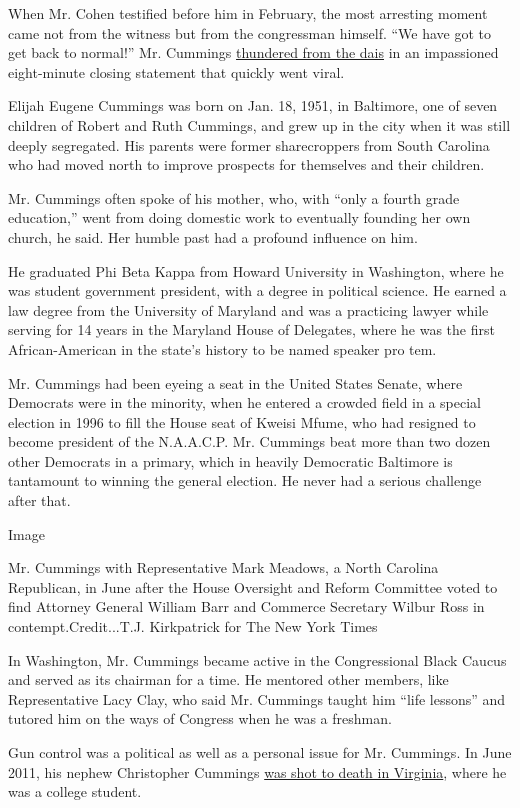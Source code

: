 When Mr. Cohen testified before him in February, the most arresting
moment came not from the witness but from the congressman himself. ``We
have got to get back to normal!'' Mr. Cummings
\href{https://www.youtube.com/watch?v=AAdmsSJXn68}{thundered from the
dais} in an impassioned eight-minute closing statement that quickly went
viral.

Elijah Eugene Cummings was born on Jan. 18, 1951, in Baltimore, one of
seven children of Robert and Ruth Cummings, and grew up in the city when
it was still deeply segregated. His parents were former sharecroppers
from South Carolina who had moved north to improve prospects for
themselves and their children.

Mr. Cummings often spoke of his mother, who, with ``only a fourth grade
education,'' went from doing domestic work to eventually founding her
own church, he said. Her humble past had a profound influence on him.

He graduated Phi Beta Kappa from Howard University in Washington, where
he was student government president, with a degree in political science.
He earned a law degree from the University of Maryland and was a
practicing lawyer while serving for 14 years in the Maryland House of
Delegates, where he was the first African-American in the state's
history to be named speaker pro tem.

Mr. Cummings had been eyeing a seat in the United States Senate, where
Democrats were in the minority, when he entered a crowded field in a
special election in 1996 to fill the House seat of Kweisi Mfume, who had
resigned to become president of the N.A.A.C.P. Mr. Cummings beat more
than two dozen other Democrats in a primary, which in heavily Democratic
Baltimore is tantamount to winning the general election. He never had a
serious challenge after that.

Image

Mr. Cummings with Representative Mark Meadows, a North Carolina
Republican, in June after the House Oversight and Reform Committee voted
to find Attorney General William Barr and Commerce Secretary Wilbur Ross
in contempt.Credit...T.J. Kirkpatrick for The New York Times

In Washington, Mr. Cummings became active in the Congressional Black
Caucus and served as its chairman for a time. He mentored other members,
like Representative Lacy Clay, who said Mr. Cummings taught him ``life
lessons'' and tutored him on the ways of Congress when he was a
freshman.

Gun control was a political as well as a personal issue for Mr.
Cummings. In June 2011, his nephew Christopher Cummings
\href{https://www.baltimoresun.com/news/bs-xpm-2011-06-13-bs-md-cummings-homicide-20110612-story.html}{was
shot to death in Virginia}, where he was a college student.


